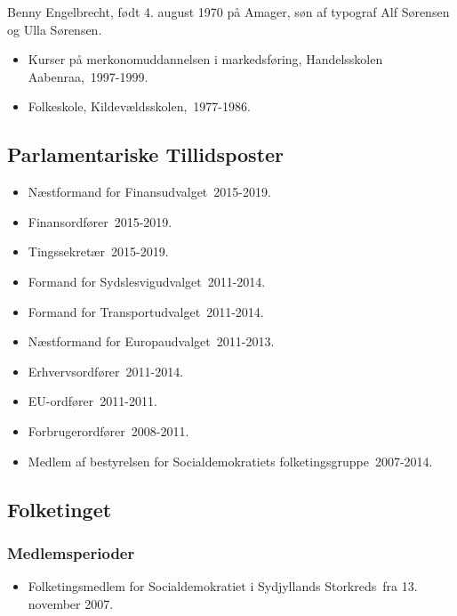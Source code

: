 \documentclass[11pt, a4paper]{awesome-cv}
\begin{document}
\makecvheader[R]
\makelettertitle
\begin{cvletter}
Benny Engelbrecht, født 4. august 1970 på Amager, søn af typograf Alf Sørensen og Ulla Sørensen.

\begin{itemize}
\item Kurser på merkonomuddannelsen i markedsføring, Handelsskolen Aabenraa, 1997-1999.
\item Folkeskole, Kildevældsskolen, 1977-1986.
\end{itemize}
\subsection*{Parlamentariske Tillidsposter}
\begin{itemize}
\item Næstformand for Finansudvalget 2015-2019.
\item Finansordfører 2015-2019.
\item Tingssekretær 2015-2019.
\item Formand for Sydslesvigudvalget 2011-2014.
\item Formand for Transportudvalget 2011-2014.
\item Næstformand for Europaudvalget 2011-2013.
\item Erhvervsordfører 2011-2014.
\item EU-ordfører 2011-2011.
\item Forbrugerordfører 2008-2011.
\item Medlem af bestyrelsen for Socialdemokratiets folketingsgruppe 2007-2014.
\end{itemize}
\subsection*{Folketinget}
\subsubsection*{Medlemsperioder}
\begin{itemize}
\item Folketingsmedlem for Socialdemokratiet i Sydjyllands Storkreds fra 13. november 2007.
\end{itemize}

\end{cvletter}
\end{document}
